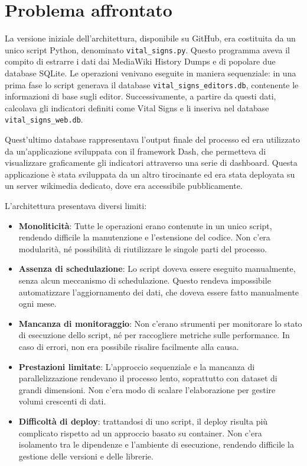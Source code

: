 \section{Problema affrontato}
\label{sec:problema_affrontato}

La versione iniziale dell’architettura, disponibile su GitHub, era costituita da un unico script Python, denominato \texttt{vital\_signs.py}. Questo programma aveva il compito di estrarre i dati dai MediaWiki History Dumps e di popolare due database SQLite. Le operazioni venivano eseguite in maniera sequenziale: in una prima fase lo script generava il database \texttt{vital\_signs\_editors.db}, contenente le informazioni di base sugli editor. Successivamente, a partire da questi dati, calcolava gli indicatori definiti come Vital Signs e li inseriva nel database \texttt{vital\_signs\_web.db}.


Quest’ultimo database rappresentava l’output finale del processo ed era utilizzato da un’applicazione sviluppata con il framework Dash, che permetteva di visualizzare graficamente gli indicatori attraverso una serie di dashboard.
Questa applicazione è stata sviluppata da un altro tirocinante ed era stata deployata su un server wikimedia dedicato, dove era accessibile pubblicamente.

L'architettura presentava diversi limiti:
\begin{itemize}
    \item \textbf{Monoliticità}: Tutte le operazioni erano contenute in un unico script, rendendo difficile la manutenzione e l'estensione del codice. Non c'era modularità, né possibilità di riutilizzare le singole parti del processo.
    \item \textbf{Assenza di schedulazione}: Lo script doveva essere eseguito manualmente, senza alcun meccanismo di schedulazione. Questo rendeva impossibile automatizzare l'aggiornamento dei dati, che doveva essere fatto manualmente ogni mese.
    \item \textbf{Mancanza di monitoraggio}: Non c'erano strumenti per monitorare lo stato di esecuzione dello script, né per raccogliere metriche sulle performance. In caso di errori, non era possibile risalire facilmente alla causa.
    \item \textbf{Prestazioni limitate}: L'approccio sequenziale e la mancanza di parallelizzazione rendevano il processo lento, soprattutto con dataset di grandi dimensioni. Non c'era modo di scalare l'elaborazione per gestire volumi crescenti di dati.
    \item \textbf{Difficoltà di deploy}: trattandosi di uno script, il deploy risulta più complicato rispetto ad un approccio basato su container. Non c'era isolamento tra le dipendenze e l'ambiente di esecuzione, rendendo difficile la gestione delle versioni e delle librerie.
\end{itemize}

